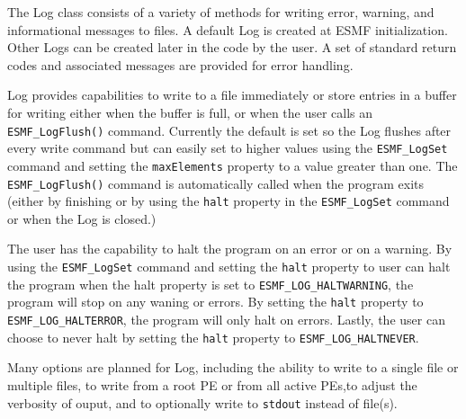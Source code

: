 



The Log class consists of a variety of methods for writing error, warning, and
informational messages to files.  A default Log is created at ESMF
initialization.  Other Logs can be created later in the code by the user.  A set
of standard return codes and associated messages are provided for error 
handling.  

Log provides capabilities to write to a file immediately or store entries in a 
buffer for writing either when the buffer is full, or when the user calls an 
{\tt ESMF\_LogFlush()} command.  Currently the default is set so the Log flushes
after every write command but can easily set to higher values using the 
{\tt ESMF\_LogSet} command and setting the {\tt maxElements} property to a value
greater than one.  The {\tt ESMF\_LogFlush()} command is automatically
called when the program exits (either by finishing or by using the {\tt halt}
property in the {\tt ESMF\_LogSet} command or when the Log is closed.)

The user has the capability to halt the program on an error or on a warning.  By 
using the {\tt ESMF\_LogSet} command and setting the {\tt halt} property to
user can halt the program when the halt property is set to 
{\tt ESMF\_LOG\_HALTWARNING}, the program will stop on any waning or errors.  By
setting the {\tt halt} property to {\tt ESMF\_LOG\_HALTERROR}, the program will 
only halt on errors.  Lastly, the user can choose to never halt by setting the 
{\tt halt} property to {\tt ESMF\_LOG\_HALTNEVER}.

Many options are planned for Log, including the ability to write to a single
file or multiple files, to write from a root PE or from all active PEs,to adjust
the verbosity of ouput, and to optionally write to {\tt stdout} instead of 
file(s).





